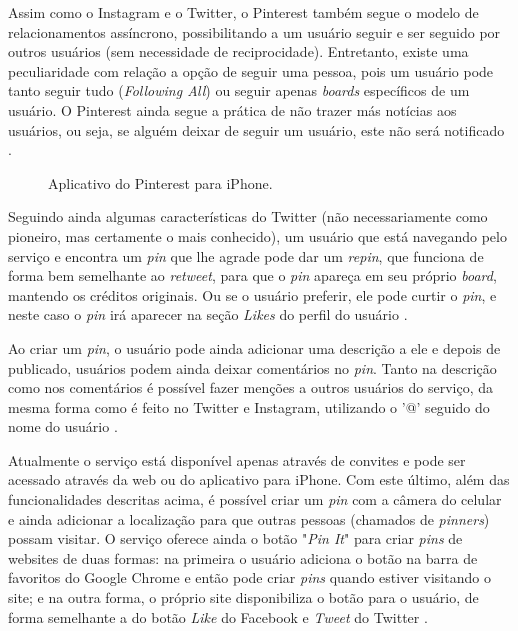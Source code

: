 \documentclass[diss]{template/setrem}
\begin{document}
Assim como o Instagram e o Twitter, o Pinterest também segue o modelo de relacionamentos assíncrono, possibilitando a um usuário seguir e ser seguido por outros usuários (sem necessidade de reciprocidade). Entretanto, existe uma peculiaridade com relação a opção de seguir uma pessoa, pois um usuário pode tanto seguir tudo (\emph{Following All}) ou seguir apenas \emph{boards} específicos de um usuário. O Pinterest ainda segue a prática de não trazer más notícias aos usuários, ou seja, se alguém deixar de seguir um usuário, este não será notificado \citep{Pinterest2012}.

\begin{figure}[!h]
    \caption{Aplicativo do Pinterest para iPhone.}
    \label{fig:pinterest}
\end{figure}

Seguindo ainda algumas características do Twitter (não necessariamente como pioneiro, mas certamente o mais conhecido), um usuário que está navegando pelo serviço e encontra um \emph{pin} que lhe agrade pode dar um \emph{repin}, que funciona de forma bem semelhante ao \emph{retweet}, para que o \emph{pin} apareça em seu próprio \emph{board}, mantendo os créditos originais. Ou se o usuário preferir, ele pode curtir o \emph{pin}, e neste caso o \emph{pin} irá aparecer na seção \emph{Likes} do perfil do usuário  \citep{Pinterest2012}.

Ao criar um \emph{pin}, o usuário pode ainda adicionar uma descrição a ele e depois de publicado, usuários podem ainda deixar comentários no \emph{pin}. Tanto na descrição como nos comentários é possível fazer menções a outros usuários do serviço, da mesma forma como é feito no Twitter e Instagram, utilizando o '@' seguido do nome do usuário \citep{Pinterest2012}.

Atualmente o serviço está disponível apenas através de convites e pode ser acessado através da web ou do aplicativo para iPhone. Com este último, além das funcionalidades descritas acima, é possível criar um \emph{pin} com a câmera do celular e ainda adicionar a localização para que outras pessoas (chamados de \emph{pinners}) possam visitar. O serviço oferece ainda o botão "\emph{Pin It}" para criar \emph{pins} de websites de duas formas: na primeira o usuário adiciona o botão na barra de favoritos do Google Chrome e então pode criar \emph{pins} quando estiver visitando o site; e na outra forma, o próprio site disponibiliza o botão para o usuário, de forma semelhante a do botão \emph{Like} do Facebook e \emph{Tweet} do Twitter \citep{Pinterest2012a}.
\end{document}
